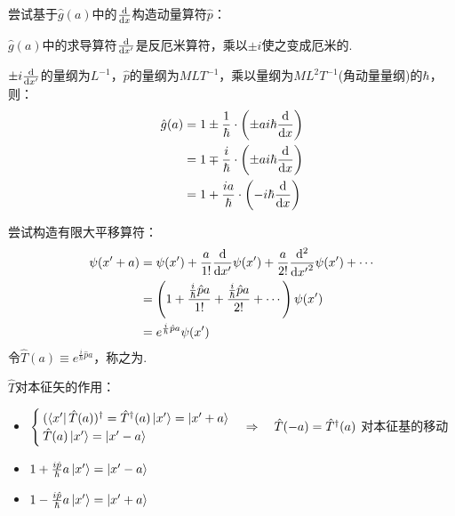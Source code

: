 \begin{derivation}
    尝试基于$\hat{g}(a)$中的$\dv{x}$构造动量算符$\hat{p}$：

    $\hat{g}(a)$中的求导算符$\dv{x'}$是反厄米算符，乘以$\pm i$使之变成厄米的.

    $\pm i\dv{x'}$的量纲为$L^{-1}$，$\hat{p}$的量纲为$MLT^{-1}$，乘以量纲为$ML^2T^{-1}$(角动量量纲)的$\hbar$，则：
    \begin{align*}
        \hat{g}(a) &= 1 \pm \frac{1}{\hbar}\cdot\left(\pm ai\hbar\dv{x}\right) \\
        &= 1 \mp \frac{i}{\hbar}\cdot\left(\pm ai\hbar\dv{x}\right) \\
        &= 1 + \frac{ia}{\hbar}\cdot\left(-i\hbar\dv{x}\right)
    \end{align*}
\end{derivation}

\begin{derivation}
    尝试构造有限大平移算符：
    \begin{align*}
        \psi(x'+a) &= \psi(x') + \frac{a}{1!}\dv{x'}\psi(x') + \frac{a}{2!}\dv[2]{}{{x'}}\psi(x') + \cdots \\
        &= \left( 1 + \frac{\frac{i}{\hbar}\hat{p}a}{1!} + \frac{\frac{i}{\hbar}\hat{p}a}{2!} + \cdots \right) \psi(x') \\
        &= e^{\frac{i}{\hbar}\hat{p}a}\psi(x')
    \end{align*}
    令$\hat{T}(a) \equiv e^{\frac{i}{\hbar}\hat{p}a}$，称之为.
\end{derivation}

$\hat{T}$对本征矢的作用：
\begin{itemize}
    \item $\begin{cases}
        (\bra{x'}\hat{T}(a))^\dagger = \hat{T}^\dagger(a)\ket{x'} = \ket{x'+a} \\
        \hat{T}(a)\ket{x'} = \ket{x'-a}
    \end{cases} \Rightarrow \quad \hat{T}(-a) = \hat{T}^\dagger(a)$ 对本征基的移动
    \item $1+\frac{i\hat{p}}{\hbar}a\ket{x'} = \ket{x'-a}$
    \item $1-\frac{i\hat{p}}{\hbar}a\ket{x'} = \ket{x'+a}$
\end{itemize}